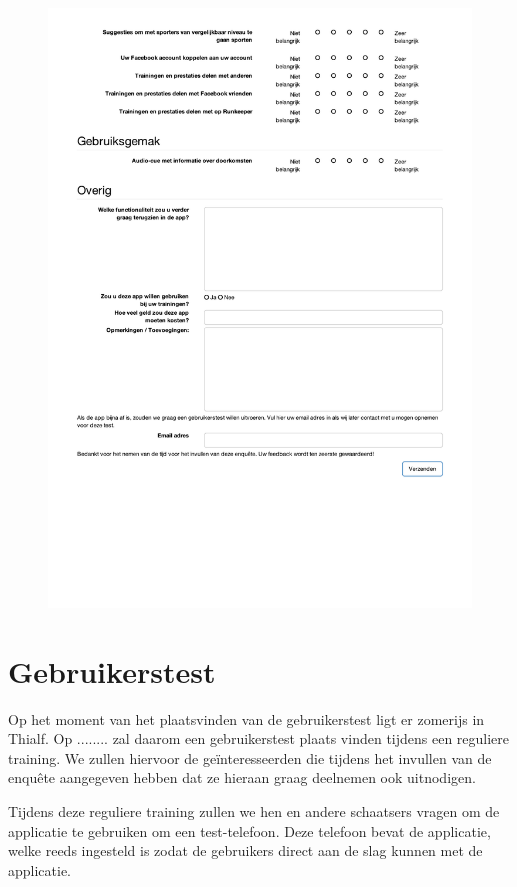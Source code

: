 \begin{figure}[ht]
  \begin{center}
    \includegraphics[width=\textwidth]{style/images/Enquete2}
  \end{center}
  \label{fig:enquete2}
\end{figure}

\section{Gebruikerstest}
Op het moment van het plaatsvinden van de gebruikerstest ligt er zomerijs in Thialf. Op ........ zal daarom een gebruikerstest plaats vinden tijdens een reguliere training. We zullen hiervoor de geïnteresseerden die tijdens het invullen van de enquête aangegeven hebben dat ze hieraan graag deelnemen ook uitnodigen.

Tijdens deze reguliere training zullen we hen en andere schaatsers vragen om de applicatie te gebruiken om een test-telefoon. Deze telefoon bevat de applicatie, welke reeds ingesteld is zodat de gebruikers direct aan de slag kunnen met de applicatie. 

